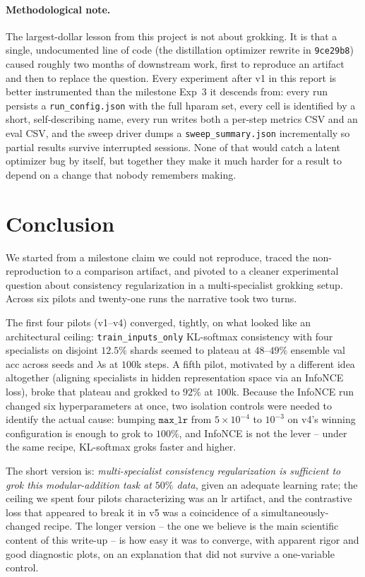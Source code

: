 \documentclass[11pt,a4paper]{article}
\begin{document}
\paragraph{Methodological note.}
The largest-dollar lesson from this project is not about grokking. It
is that a single, undocumented line of code (the distillation
optimizer rewrite in \texttt{9ce29b8}) caused roughly two months of
downstream work, first to reproduce an artifact and then to replace
the question. Every experiment after v1 in this report is better
instrumented than the milestone Exp~3 it descends from: every run
persists a \texttt{run\_config.json} with the full hparam set, every
cell is identified by a short, self-describing name, every run writes
both a per-step metrics CSV and an eval CSV, and the sweep driver
dumps a \texttt{sweep\_summary.json} incrementally so partial results
survive interrupted sessions. None of that would catch a latent
optimizer bug by itself, but together they make it much harder for a
result to depend on a change that nobody remembers making.

\section{Conclusion}
\label{sec:conclusion}

We started from a milestone claim we could not reproduce, traced the
non-reproduction to a comparison artifact, and pivoted to a cleaner
experimental question about consistency regularization in a
multi-specialist grokking setup. Across six pilots and twenty-one runs
the narrative took two turns.

The first four pilots (v1--v4) converged, tightly, on what looked like
an architectural ceiling: \texttt{train\_inputs\_only} KL-softmax
consistency with four specialists on disjoint $12{.}5\%$ shards seemed
to plateau at $48$--$49\%$ ensemble val acc across seeds and $\lambda$s
at $100$k steps. A fifth pilot, motivated by a different idea
altogether (aligning specialists in hidden representation space via
an InfoNCE loss), broke that plateau and grokked to $92\%$ at $100$k.
Because the InfoNCE run changed six hyperparameters at once, two
isolation controls were needed to identify the actual cause: bumping
$\mathtt{max\_lr}$ from $5{\times}10^{-4}$ to $10^{-3}$ on v4's winning
configuration is enough to grok to $100\%$, and InfoNCE is not the
lever -- under the same recipe, KL-softmax groks faster and higher.

The short version is: \emph{multi-specialist consistency regularization
is sufficient to grok this modular-addition task at $50\%$ data}, given
an adequate learning rate; the ceiling we spent four pilots
characterizing was an lr artifact, and the contrastive loss that
appeared to break it in v5 was a coincidence of a simultaneously-changed
recipe. The longer version -- the one we believe is the main
scientific content of this write-up -- is how easy it was to converge,
with apparent rigor and good diagnostic plots, on an explanation that
did not survive a one-variable control.
\end{document}
